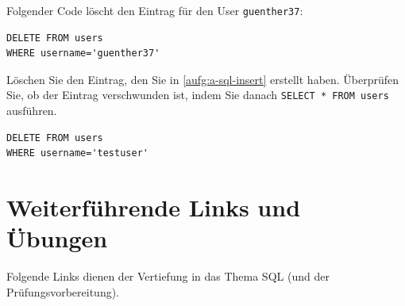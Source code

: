 \begin{myexample}
Folgender Code löscht den Eintrag für den User \texttt{guenther37}:
\begin{lstlisting}
DELETE FROM users
WHERE username='guenther37'
\end{lstlisting}
\end{myexample}

\begin{myexercise}
  Löschen Sie den Eintrag, den Sie in \cref{aufg:a-sql-insert} erstellt haben. Überprüfen Sie, ob der Eintrag verschwunden ist, indem Sie danach \lstinline|SELECT * FROM users| ausführen.
  \begin{myanswer}
    \begin{lstlisting}
DELETE FROM users
WHERE username='testuser'
\end{lstlisting}
  \end{myanswer}
\end{myexercise}

\section{Weiterführende Links und Übungen}
Folgende Links dienen der Vertiefung in das Thema \gls{SQL} (und der Prüfungsvorbereitung).

